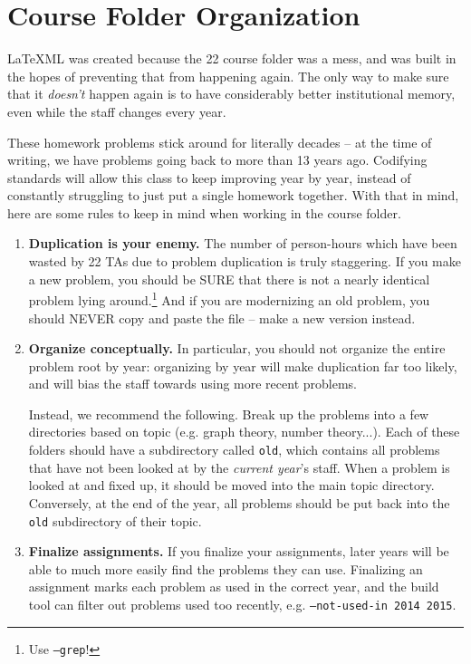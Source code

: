 {
\newcommand\comm[1]{\texttt{\textbackslash #1}}

\section{Course Folder Organization}
  \LaTeX ML was created because the 22 course folder was a mess, and was
  built in the hopes of preventing that from happening again. The only way
  to make sure that it \textit{doesn't} happen again is to have considerably
  better institutional memory, even while the staff changes every year.
  
  These homework problems
  stick around for literally decades -- at the time of writing, we have
  problems going back to more than 13 years ago. Codifying standards will
  allow this class to keep improving year by year, instead of constantly 
  struggling to just put a single homework together. With that in
  mind, here are some rules to keep in mind when working in the course
  folder.
  \begin{enumerate}
    \item \textbf{Duplication is your enemy.} The number of person-hours which
      have been wasted by 22 TAs due to problem duplication is truly
      staggering. If you make a new problem, you should be SURE that there is
      not a nearly identical problem lying around.\footnote{Use 
      \texttt{\pybuild --grep}!} And if you are modernizing an old problem,
      you should NEVER copy and paste the file -- make a new version
      instead.
    \item \textbf{Organize conceptually.} In particular, you should not
      organize the entire problem root by year: organizing by year will
      make duplication far too likely, and will bias the staff towards
      using more recent problems.
      
      Instead, we recommend the following. Break up the problems into a
      few directories based on topic (e.g. graph theory, number theory...).
      Each of these folders should have a subdirectory called \texttt{old},
      which contains all problems that have not been looked at by the 
      \textit{current year}'s staff. When a problem is looked at and fixed
      up, it should be moved into the main topic directory. Conversely,
      at the end of the year, all problems should be put back into the
      \texttt{old} subdirectory of their topic.
    \item \textbf{Finalize assignments.} If you finalize your assignments,
      later years will be able to much more easily find the problems they
      can use. Finalizing an assignment marks each problem as used in
      the correct year, and the build tool can filter out problems used
      too recently, e.g. \texttt{--not-used-in 2014 2015}.
      

\end{enumerate}}
